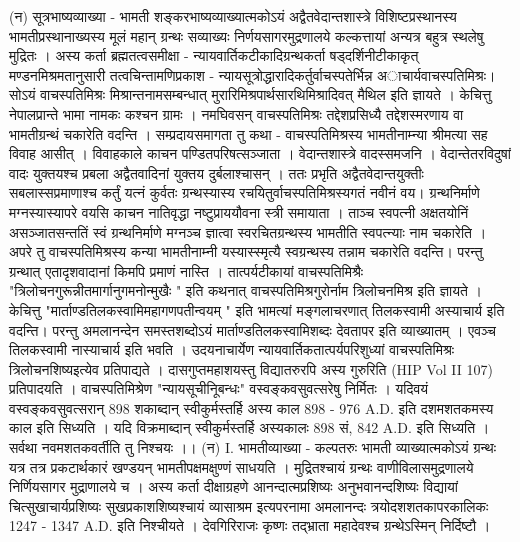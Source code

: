(न) सूत्रभाष्यव्याख्या - भामती 
शङ्करभाष्यव्याख्यात्मकोऽयं अद्वैतवेदान्तशास्त्रे विशिष्टप्रस्थानस्य भामतीप्रस्थानाख्यस्य मूलं महान् ग्रन्थः सव्याख्यः निर्णयसागरमुद्रणालये कल्कत्तायां अन्यत्र बहुत्र स्थलेषु मुद्रितः । अस्य कर्ता ब्रह्मतत्वसमीक्षा - न्यायवार्तिकटीकादिग्रन्थकर्ता षड्दर्शिनीटीकाकृत् मण्डनमिश्रमतानुसारी तत्वचिन्तामणिप्रकाश - न्यायसूत्रोद्धारादिकर्तुर्वाचस्पतेर्भिन्न अाचार्यवाचस्पतिमिश्रः। सोऽयं वाचस्पतिमिश्रः मिश्रान्तनामसम्बन्धात् मुरारिमिश्रपार्थसारथिमिश्रादिवत् मैथिल इति ज्ञायते । केचित्तु नेपालप्रान्ते भामा नामकः कश्चन ग्रामः । नमघिवसन् वाचस्पतिमिश्रः तद्देशप्रसिध्यै तद्देशस्मरणाय वा भामतीग्रन्थं चकारेति वदन्ति । सम्प्रदायसमागता तु कथा - 
वाचस्पतिमिश्रस्य भामतीनाम्न्या श्रीमत्या सह विवाह आसीत् । विवाहकाले काचन पण्डितपरिषत्सञ्जाता । वेदान्तशास्त्रे वादस्समजनि । वेदान्तेतरविदुषां वादः युक्तयश्च प्रबला अद्वैतवादिनां युक्तय दुर्बलाश्चासन् । ततः प्रभृति अद्वैतवेदान्तयुक्तीः सबलास्सप्रमाणाश्च कर्तुं यत्नं कुर्वतः ग्रन्थस्यास्य रचयितुर्वाचस्पतिमिश्रस्यगतं नवीनं वय। ग्रन्थनिर्माणे मग्नस्यास्यापरे वयसि काचन नातिवृद्धा नष्टुप्राययौवना स्त्री समायाता । ताञ्च स्वपत्नी अक्षतयोनिं असञ्जातसन्ततिं स्वं ग्रन्थनिर्माणे मग्नञ्च ज्ञात्वा स्वरचितग्रन्थस्य भामतीति स्वपत्न्याः नाम चकारेति । अपरे तु वाचस्पतिमिश्रस्य कन्या भामतीनाम्नी यस्यास्स्मृत्यै स्वग्रन्थस्य तन्नाम चकारेति वदन्ति। परन्तु ग्रन्थात् एतादृशवादानां किमपि प्रमाणं नास्ति । 
तात्पर्यटीकायां वाचस्पतिमिश्रैः "त्रिलोचनगुरून्नीतमार्गानुगमनोन्मुखैः " इति कथनात् वाचस्पतिमिश्रगुरोर्नाम त्रिलोचनमिश्र इति ज्ञायते । केचित्तु "मार्ताण्डतिलकस्वामिमहागणपतीन्वयम्  " इति भामत्यां मङ्गलाचरणात् तिलकस्वामी अस्याचार्य इति वदन्ति। परन्तु अमलानन्देन समस्तशब्दोऽयं मार्ताण्डतिलकस्वामिशब्दः देवतापर इति व्याख्यातम् । एवञ्च तिलकस्वामी नास्याचार्य इति भवति । उदयनाचार्येण न्यायवार्तिकतात्पर्यपरिशुध्यां वाचस्पतिमिश्रः त्रिलोचनशिष्यइत्येव प्रतिपाद्यते । दासगुप्तमहाशयस्तु विद्यातरुरपि अस्य गुरुरिति (HIP Vol II 107) प्रतिपादयति । 
वाचस्पतिमिश्रेण "न्यायसूचीनिूबन्धः" वस्वङ्कवसुवत्सरेषु निर्मितः । यदिवयं वस्वङ्कवसुवत्सरान् 898 शकाब्दान् स्वीकुर्मस्तर्हि अस्य काल 898 - 976 A.D. इति दशमशतकमस्य काल इति सिध्यति । यदि विक्रमाब्दान् स्वीकुर्मस्तर्हि अस्यकालः 898 सं, 842 A.D. इति सिध्यति । सर्वथा नवमशतकवर्तीति तु निश्चयः ।। 
(न) I. भामतीव्याख्या - कल्पतरुः 
भामती व्याख्यात्मकोऽयं ग्रन्थः यत्र तत्र प्रकटार्थकारं खण्डयन् भामतीपक्षमक्षुण्णं साधयति । मुद्रितश्चायं ग्रन्थः वाणीविलासमुद्रणालये निर्णियसागर मुद्राणालये च । अस्य कर्ता दीक्षाग्रहणे आनन्दात्मप्रशिष्यः अनुभवानन्दशिष्यः विद्यायां चित्सुखाचार्यप्रशिष्यः सुखप्रकाशशिष्यश्चायं व्यासाश्रम इत्यपरनामा अमलानन्दः त्रयोदशशतकापरकालिकः 1247 - 1347 A.D. इति निश्चीयते । देवगिरिराजः कृष्णः तद्भ्राता महादेवश्च ग्रन्थेऽस्मिन् निर्दिष्टौ । 

